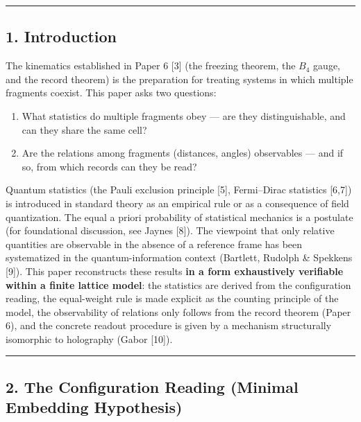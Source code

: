 \documentclass[
]{article}
\providecommand{\tightlist}{%
  \setlength{\itemsep}{0pt}\setlength{\parskip}{0pt}}
\begin{document}
\begin{center}\rule{0.5\linewidth}{0.5pt}\end{center}

\subsection{1. Introduction}\label{introduction}

The kinematics established in Paper 6 {[}3{]} (the freezing theorem, the
\(B_4\) gauge, and the record theorem) is the preparation for treating
systems in which multiple fragments coexist. This paper asks two
questions:

\begin{enumerate}
\def\labelenumi{\arabic{enumi}.}
\tightlist
\item
  What statistics do multiple fragments obey --- are they
  distinguishable, and can they share the same cell?
\item
  Are the relations among fragments (distances, angles) observables ---
  and if so, from which records can they be read?
\end{enumerate}

Quantum statistics (the Pauli exclusion principle {[}5{]}, Fermi--Dirac
statistics {[}6,7{]}) is introduced in standard theory as an empirical
rule or as a consequence of field quantization. The equal a priori
probability of statistical mechanics is a postulate (for foundational
discussion, see Jaynes {[}8{]}). The viewpoint that only relative
quantities are observable in the absence of a reference frame has been
systematized in the quantum-information context (Bartlett, Rudolph \&
Spekkens {[}9{]}). This paper reconstructs these results \textbf{in a
form exhaustively verifiable within a finite lattice model}: the
statistics are derived from the configuration reading, the equal-weight
rule is made explicit as the counting principle of the model, the
observability of relations only follows from the record theorem (Paper
6), and the concrete readout procedure is given by a mechanism
structurally isomorphic to holography (Gabor {[}10{]}).

\begin{center}\rule{0.5\linewidth}{0.5pt}\end{center}

\subsection{2. The Configuration Reading (Minimal Embedding
Hypothesis)}\label{the-configuration-reading-minimal-embedding-hypothesis}
\end{document}
